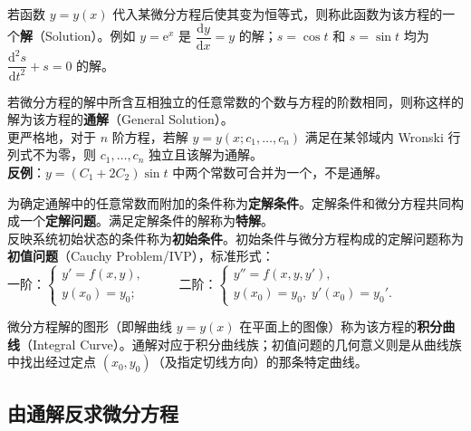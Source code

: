 \documentclass[lang=cn,11pt]{elegantbook}
\begin{document}
\begin{definition}[微分方程的解] \label{def:ode-solution}
若函数 $y=y(x)$ 代入某微分方程后使其变为恒等式，则称此函数为该方程的一个\textbf{解}（Solution）。例如 $y=\mathrm{e}^x$ 是 $\dfrac{\mathrm{d}y}{\mathrm{d}x}=y$ 的解；$s=\cos t$ 和 $s=\sin t$ 均为 $\dfrac{\mathrm{d}^2s}{\mathrm{d}t^2}+s=0$ 的解。
\end{definition}

\begin{definition}[通解] \label{def:ode-general-solution}
若微分方程的解中所含互相独立的任意常数的个数与方程的阶数相同，则称这样的解为该方程的\textbf{通解}（General Solution）。\\
更严格地，对于 $n$ 阶方程，若解 $y=y(x;c_1,\dots,c_n)$ 满足在某邻域内 Wronski 行列式不为零，则 $c_1,\dots,c_n$ 独立且该解为通解。\\
\textbf{反例}：$y=(C_1+2C_2)\sin t$ 中两个常数可合并为一个，不是通解。
\end{definition}

\begin{definition}[特解与定解条件] \label{def:ode-initial-value}
为确定通解中的任意常数而附加的条件称为\textbf{定解条件}。定解条件和微分方程共同构成一个\textbf{定解问题}。满足定解条件的解称为\textbf{特解}。\\
反映系统初始状态的条件称为\textbf{初始条件}。初始条件与微分方程构成的定解问题称为\textbf{初值问题}（Cauchy Problem/IVP），标准形式：\\
一阶：$\begin{cases} y'=f(x,y), \\ y(x_0)=y_0; \end{cases}$~~~~~二阶：$\begin{cases} y''=f(x,y,y'), \\ y(x_0)=y_0,\; y'(x_0)=y_0'. \end{cases}$
\end{definition}

\begin{definition}[积分曲线] \label{def:ode-integral-curve}
微分方程解的图形（即解曲线 $y=y(x)$ 在平面上的图像）称为该方程的\textbf{积分曲线}（Integral Curve）。通解对应于积分曲线族；初值问题的几何意义则是从曲线族中找出经过定点 $(x_0, y_0)$（及指定切线方向）的那条特定曲线。
\end{definition}

\subsection{由通解反求微分方程}
\end{document}
